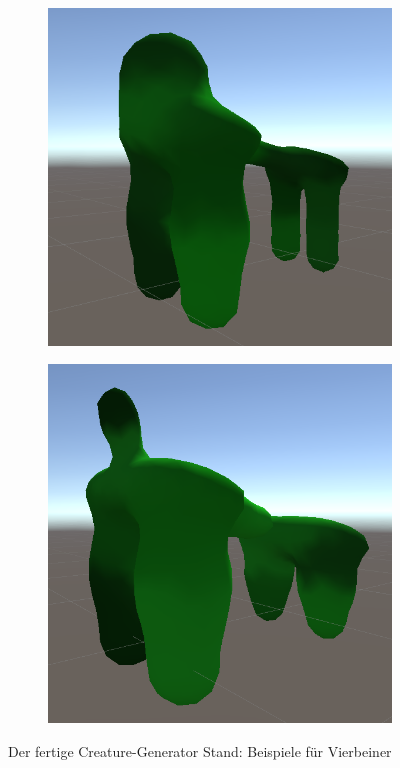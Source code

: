 \begin{figure}[ht]
\begin{subfigure}[b]{0.2\textwidth}
    \end{subfigure}
    \begin{subfigure}[b]{0.2\textwidth}
        \centering
        \includegraphics[width=\textwidth, height=\textwidth]{resources/img/Finished_Creatures_4/creature_11}
    \end{subfigure}
    \begin{subfigure}[b]{0.2\textwidth}
        \centering
        \includegraphics[width=\textwidth, height=\textwidth]{resources/img/Finished_Creatures_4/creature_12}
    \end{subfigure}
    \caption{Der fertige Creature-Generator Stand: Beispiele für Vierbeiner}
    \label{fig:finished_CG_4}
\end{figure}


